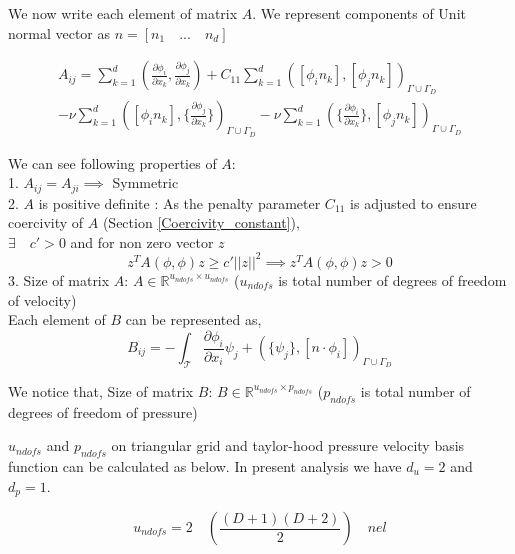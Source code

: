 \documentclass[a4paper,openany]{book}
\begin{document}
We now write each element of matrix $A$. We represent components of Unit normal vector as $n = [n_1 \quad ... \quad n_d]$

\begin{equation} \label{matrix A}
\begin{split}
A_{ij} = \sum_{k=1}^d (\frac{\partial \phi_i}{\partial x_k} , \frac{\partial \phi_j}{\partial x_k}) + C_{11} \sum_{k=1}^d ([\phi_i n_k] , [\phi_j n_k])_{\Gamma \cup \Gamma_D} \\ - \nu \sum_{k=1}^d ([\phi_i n_k] , \lbrace \frac{\partial \phi_j}{\partial x_k} \rbrace)_{\Gamma \cup \Gamma_D} - \nu \sum_{k=1}^d (\lbrace \frac{\partial \phi_i}{\partial x_k} \rbrace , [\phi_j n_k])_{\Gamma \cup \Gamma_D}
\end{split}
\end{equation}

We can see following properties of $A$: 
\\
1. $A_{ij} = A_{ji} \implies$ Symmetric\\
2. $A$ is positive definite : As the penalty parameter $C_{11}$ is adjusted to ensure coercivity of $A$ (Section \ref{Coercivity_constant}),\\
$\exists \quad c' > 0 $ and for non zero vector $z$
\begin{equation}
z^T A( \phi , \phi ) z \geq c' || z ||^2 \implies z^T A( \phi , \phi ) z > 0
\end{equation}
3. Size of matrix $A$: $A \in \mathbb{R}^{u_{ndofs} \times u_{ndofs}}$ ($u_{ndofs}$ is total number of degrees of freedom of velocity)\\

Each element of $B$ can be represented as,\\
\begin{equation} \label{matrix B}
B_{ij} = - \int_\mathcal{T} \frac{\partial \phi_i}{\partial x_i} \psi_j + (\lbrace \psi_j \rbrace , [n \cdot \phi_i])_{\Gamma \cup \Gamma_D}
\end{equation}

We notice that, Size of matrix $B$: $B \in \mathbb{R}^{u_{ndofs} \times p_{ndofs}}$ ($p_{ndofs}$ is total number of degrees of freedom of pressure)

$u_{ndofs}$ and $p_{ndofs}$ on triangular grid and taylor-hood pressure velocity basis function can be calculated as below. In present analysis we have $d_u = 2$ and $d_p = 1$.

\begin{equation} \label{undofs}
u_{ndofs} = 2 \quad \left( \frac{(D+1)(D+2)}{2} \right) \quad nel
\end{equation}
\end{document}
